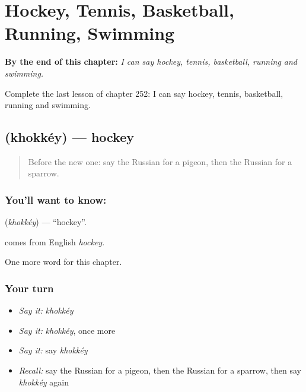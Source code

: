 
\chapter{Hockey, Tennis, Basketball, Running, Swimming}
\label{ch:ru-hockey-tennis-basketball-running-swimming}

\begin{chapteropening}
\textbf{By the end of this chapter:} \emph{I can say hockey, tennis, basketball, running and swimming.}

Complete the last lesson of chapter 252: I can say hockey, tennis, basketball, running and swimming.
\end{chapteropening}

\section[\texorpdfstring{\ru{хоккей} (khokkéy)}{хоккей (khokkéy)}]{ (khokkéy) — hockey}

\label{lesson:RU-C252-khokkey}



\begin{quote}
Before the new one: say the Russian for a pigeon, then the Russian for a sparrow.
\end{quote}

\subsection*{You'll want to know: }
\textbf{} (\emph{khokkéy}) — \textquotedblleft{}hockey\textquotedblright{}.

\begin{cousinweb}
\textbf{} comes from English \emph{hockey}.
\end{cousinweb}

\begin{grammarlens}[title={What you've built}]
One more word for this chapter.
\end{grammarlens}

\subsection*{Your turn}
\begin{itemize}
\raggedright
  \item \emph{Say it:} \emph{khokkéy}
  \item \emph{Say it:} \emph{khokkéy}, once more
  \item \emph{Say it:} say \emph{khokkéy}
  \item \emph{Recall:} say the Russian for a pigeon, then the Russian for a sparrow, then say \emph{khokkéy} again
\end{itemize}


